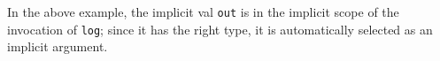\documentclass[preprint]{sigplanconf}
\newcommand{\ie}{{\em i.e.,~}}
\newcommand{\term}[1]{\mbox{\texttt{#1}}}
\begin{document}
In the above example, the implicit val \term{out} is in the implicit scope of
the invocation of \term{log}; since it has the right type, it is automatically
selected as an implicit argument.

\end{document}
